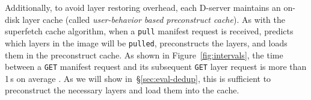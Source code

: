 Additionally, to avoid layer restoring overhead,
each D-server maintains an on-disk layer cache (called \emph{user-behavior based preconstruct cache}).
As with the superfetch cache algorithm,
when a \texttt{pull} manifest request is received,
\sysname predicts which layers in the image will be \texttt{pulled},
preconstructs the layers, and loads them in the preconstruct cache.
%
%
%
As shown in Figure~\ref{fig:intervals}, the time between a \texttt{GET} manifest request and its
subsequent \texttt{GET} layer request is more than 1\,s on average . As we will show in~\S\ref{sec:eval-dedup}, this is
sufficient to preconstruct the necessary layers and load them into the cache.

%
%
  


